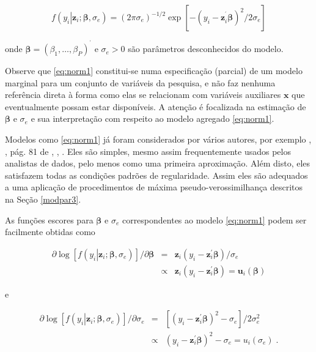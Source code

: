 \documentclass[]{book}
\theoremstyle{definition}
\theoremstyle{definition}
\theoremstyle{definition}
\theoremstyle{remark}
\begin{document}
\begin{equation}
f\left( \left. y_{i}\right|\mathbf{z}_{i};\mathbf{\beta },\sigma_{e}\right) =\left( 2\pi \sigma _{e}\right) ^{-1/2}\exp \left[ -\left( y_{i}-\mathbf{z}_{i}^{^{\prime }}\mathbf{\beta }\right) ^{2}/2\sigma _{e}\right]
\label{eq:norm1}
\end{equation}

onde
\(\mathbf{\beta }=\left( \beta _{1},\ldots ,\beta _{P}\right) ^{^{\prime }}\)
e \(\sigma_{e}>0\) são parâmetros desconhecidos do modelo.

Observe que \eqref{eq:norm1} constitui-se numa especificação (parcial) de
um modelo marginal para um conjunto de variáveis da pesquisa, e não faz
nenhuma referência direta à forma como elas se relacionam com variáveis
auxiliares \(\mathbf{x}\) que eventualmente possam estar disponíveis. A
atenção é focalizada na estimação de \(\mathbf{\beta }\) e
\(\sigma_{e}\) e sua interpretação com respeito ao modelo agregado
\eqref{eq:norm1}.

Modelos como \eqref{eq:norm1} já foram considerados por vários autores,
por exemplo \citep{holt80b}, \citep{NH80}, pág. 81 de \citep{Sk89b} ,
\citep{chambers86}, \citep{chambers95}. Eles são simples, mesmo assim
frequentemente usados pelos analistas de dados, pelo menos como uma
primeira aproximação. Além disto, eles satisfazem todas as condições
padrões de regularidade. Assim eles são adequados a uma aplicação de
procedimentos de máxima pseudo-verossimilhança descritos na Seção
\ref{modpar3}.

As funções escores para \(\mathbf{\beta}\) e \(\sigma _{e}\)
correspondentes ao modelo \eqref{eq:norm1} podem ser facilmente obtidas
como

\begin{eqnarray}
\partial \log \left[ f\left( \left. y_{i}\right| \mathbf{z}_{i};\mathbf{
\beta },\sigma _{e}\right) \right] /\partial \mathbf{\beta } &=&\mathbf{z}
_{i}\left( y_{i}-\mathbf{z}_{i}^{\prime }\mathbf{\beta }\right) /\sigma _{e}
\label{eq:norm2} \\
&\propto &\mathbf{z}_{i}\left( y_{i}-\mathbf{z}_{i}^{\prime }\mathbf{
\beta }\right) =\mathbf{u}_{i}\left( \mathbf{\beta }\right)  \nonumber
\end{eqnarray}

e

\begin{eqnarray*}
\partial \log \left[ f\left( \left. y_{i}\right| \mathbf{z}_{i};\mathbf{
\beta },\sigma _{e}\right) \right] /\partial \sigma _{e} &=&\left[ \left(
y_{i}-\mathbf{z}_{i}^{\prime }\mathbf{\beta }\right) ^{2}-\sigma _{e}\right]
/2\sigma _{e}^{2}  \label{eq:norm3} \\
&\propto &\left( y_{i}-\mathbf{z}_{i}^{\prime }\mathbf{\beta }\right)
^{2}-\sigma _{e}=u_{i}\left( \sigma _{e}\right) \;.  
\end{eqnarray*}
\end{document}
